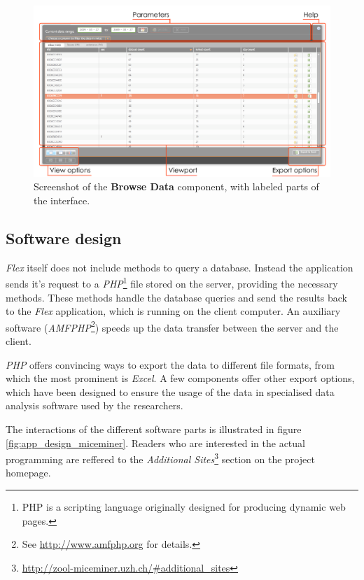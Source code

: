 \begin{figure}[!htbp]
\begin{center}
  \includegraphics[width=.75\textwidth]{assets/pdf/interface_component.pdf}
  \caption[miceminer coponent interface]{Screenshot of the \textbf{Browse Data} component, with labeled parts of the interface.}
  \label{fig:interface_component}
\end{center}
\end{figure}

\subsection{Software design}
\label{subsec:miceminer_design}   

\textit{Flex} itself does not include methods to query a database. Instead the application sends it's request to a \textit{PHP}\footnote{PHP is a scripting language originally designed for producing dynamic web pages\cite{wiki:php}.} file stored on the server, providing the necessary methods. These methods handle the database queries and send the results back to the \textit{Flex} application, which is running on the client computer. An auxiliary software (\textit{AMFPHP}\footnote{See \href{http://www.amfphp.org}{http://www.amfphp.org} for details.}) speeds up the data transfer between the server and the client.

\textit{PHP} offers convincing ways to export the data to different file formats, from which the most prominent is \textit{Excel}. A few components offer other export options, which have been designed to ensure the usage of the data in specialised data analysis software used by the researchers.

The interactions of the different software parts is illustrated in figure \ref{fig:app_design_miceminer}. Readers who are interested in the actual programming are reffered to the \textit{Additional Sites}\footnote{\href{http://zool-miceminer.uzh.ch/\#additional_sites}{http://zool-miceminer.uzh.ch/\#additional\_sites}} section on the project homepage.   

